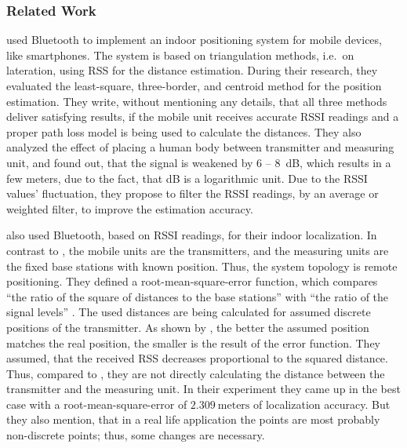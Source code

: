\subsubsection*{Related Work}
\citet{wang:bt_pos} used Bluetooth to implement an indoor positioning system for mobile devices, like smartphones. The system is based on triangulation methods, i.e.\ on lateration, using \acs{RSS} for the distance estimation. During their research, they evaluated the least-square, three-border, and centroid method for the position estimation. They write, without mentioning any details, that all three methods deliver satisfying results, if the mobile unit receives accurate \acs{RSSI} readings and a proper path loss model is being used to calculate the distances. They also analyzed the effect of placing a human body between transmitter and measuring unit, and found out, that the signal is weakened by 6 -- 8~dB, which results in a few meters, due to the fact, that dB is a logarithmic unit. Due to the \ac{RSSI} values' fluctuation, they propose to filter the \acs{RSSI} readings, by an average or weighted filter, to improve the estimation accuracy.

\citet{oksar:bluetooth} also used Bluetooth, based on \acs{RSSI} readings, for their indoor localization. In contrast to \citet{wang:bt_pos}, the mobile units are the transmitters, and the measuring units are the fixed base stations with known position. Thus, the system topology is remote positioning. They defined a root-mean-square-error function, which compares ``the ratio of the square of distances to the base stations'' with ``the ratio of the signal levels'' \citep{oksar:bluetooth}. The used distances are being calculated for assumed discrete positions of the transmitter. As shown by \citet{oksar:bluetooth}, the better the assumed position matches the real position, the smaller is the result of the error function. They assumed, that the received \acs{RSS} decreases proportional to the squared distance. Thus, compared to \citet{wang:bt_pos}, they are not directly calculating the distance between the transmitter and the measuring unit. In their experiment they came up in the best case with a root-mean-square-error of $2.309~\text{meters}$ of localization accuracy. But they also mention, that in a real life application the points are most probably non-discrete points; thus, some changes are necessary.

